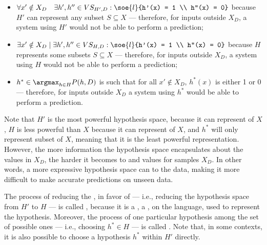 \documentclass[a4paper, 12pt]{report}
\begin{document}
    \begin{itemize}
        \item $\forall x' \notin X_D \quad \exists h', h'' \in VS_{H', D} : \soe{l}{h'(x) = 1 \\ h''(x) = 0}$ because $H'$ can represent any subset $S \subseteq X$ --- therefore, for  inputs outside $X_D$, a system using $H'$ would not be able to perform a prediction;
        \item $\exists x' \notin X_D \mid \exists h', h'' \in VS_{H, D} : \soe{l}{h'(x) = 1 \\ h''(x) = 0}$ because $H$ represents some subsets $S \subseteq X$ ---  therefore, for  inputs outside $X_D$, a system using $H$ would not be able to perform a prediction;
        \item $h^* \in \argmax_{h \in H}{P(h, D)}$ is such that for all $x' \notin X_D$, $h^*(x)$ is either 1 or 0 --- therefore, for  inputs outside $X_D$ a system using $h^*$ would be able to perform a prediction.
    \end{itemize}

    Note that $H'$ is the most powerful hypothesis space, because it can represent  of $X$, $H$ is less powerful than $X$ because it can represent  of $X$, and $h^*$ will only represent  subset of $X$, meaning that it is the least powerful representation. However, the more information the hypothesis space encapsulates about the values in $X_D$, the harder it becomes to  and  values for samples  $X_D$. In other words, a more expressive hypothesis space can  to the data, making it more difficult to make accurate predictions on unseen data.
    
    The process of reducing the , in favor of  --- i.e., reducing the hypothesis space from $H'$ to $H$ --- is called , because it is a , a , on the language, used to represent the hypothesis. Moreover, the process of  one particular hypothesis among the set of possible ones --- i.e., choosing $h^* \in H$ --- is called . Note that, in some contexts, it is also possible to choose a hypothesis $h^*$ within $H'$ directly.
\end{document}
